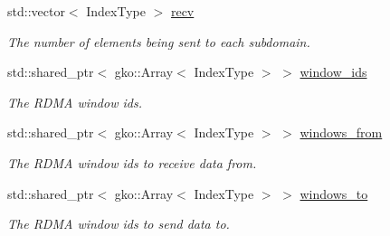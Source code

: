 \begin{DoxyCompactItemize}
\mbox{\label{structschwz_1_1Communicate_1_1comm__struct_a39634304cc492cf00a2d60eea9a97799}} 
std\+::vector$<$ Index\+Type $>$ \hyperlink{structschwz_1_1Communicate_1_1comm__struct_a39634304cc492cf00a2d60eea9a97799}{recv}
\begin{DoxyCompactList}\small\item\em The number of elements being sent to each subdomain. \end{DoxyCompactList}\item 
\mbox{\label{structschwz_1_1Communicate_1_1comm__struct_a179dd67dc2d6ea4b71a6d5964cac18c6}} 
std\+::shared\+\_\+ptr$<$ gko\+::\+Array$<$ Index\+Type $>$ $>$ \hyperlink{structschwz_1_1Communicate_1_1comm__struct_a179dd67dc2d6ea4b71a6d5964cac18c6}{window\+\_\+ids}
\begin{DoxyCompactList}\small\item\em The R\+D\+MA window ids. \end{DoxyCompactList}\item 
\mbox{\label{structschwz_1_1Communicate_1_1comm__struct_a167c62a1a0cf2be8351e1ab65a264cf2}} 
std\+::shared\+\_\+ptr$<$ gko\+::\+Array$<$ Index\+Type $>$ $>$ \hyperlink{structschwz_1_1Communicate_1_1comm__struct_a167c62a1a0cf2be8351e1ab65a264cf2}{windows\+\_\+from}
\begin{DoxyCompactList}\small\item\em The R\+D\+MA window ids to receive data from. \end{DoxyCompactList}\item 
\mbox{\label{structschwz_1_1Communicate_1_1comm__struct_aef866f16ced557ba1496cffaf7c2473e}} 
std\+::shared\+\_\+ptr$<$ gko\+::\+Array$<$ Index\+Type $>$ $>$ \hyperlink{structschwz_1_1Communicate_1_1comm__struct_aef866f16ced557ba1496cffaf7c2473e}{windows\+\_\+to}
\begin{DoxyCompactList}\small\item\em The R\+D\+MA window ids to send data to. \end{DoxyCompactList}\item 
\mbox{\label{structschwz_1_1Communicate_1_1comm__struct_a9f135d4c33838027f8ed64a3ee18d42f}} 

\end{DoxyCompactItemize}
